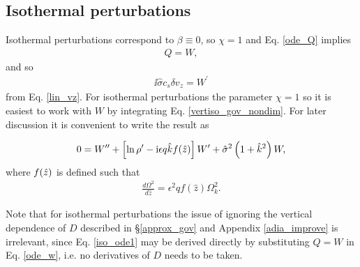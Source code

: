 \subsection{Isothermal perturbations}\label{iso_discuss}
Isothermal perturbations correspond to $\beta\equiv0$, 
so $\chi=1$ and Eq. \ref{ode_Q} implies 
\begin{align}
  Q = W, 
\end{align}
 and so 
 \begin{align}
   \ii\hat{\sigma}c_s\delta v_z = W^\prime
 \end{align}
from Eq. \ref{lin_vz}. For isothermal perturbations 
the parameter $\chi=1$ so it is easiest to work with
$W$ by integrating Eq. \ref{vertiso_gov_nondim}. For later discussion
it is convenient to write the result as 

\begin{align}
  0 = W^{\prime\prime} + \left[\ln\rho^\prime - \mathrm{i} \epsilon q \hat{k}
    f(\hat{z})\right]W^\prime + \hat{\sigma}^2\left(1+\hat{k}^2\right)W,\label{iso_ode1}
\end{align}
where $f(\hat{z})$ is defined such that
\begin{align}\label{fz_shear}
  \frac{d\Omega^2}{d\hat{z}} = \epsilon^2q f(\hat{z})\Omega_k^2.
\end{align}


Note that for isothermal perturbations the issue of ignoring the
vertical dependence of $D$ described in \S\ref{approx_gov} and Appendix
\ref{adia_improve} is irrelevant, since
Eq. \ref{iso_ode1} may be derived directly by substituting $Q=W$ in
Eq. \ref{ode_w}, i.e. no derivatives of $D$ needs to be taken. 

